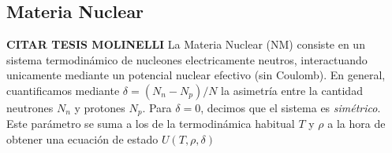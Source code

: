 \subsection{Materia Nuclear}{\label{sec:intro_NM}}

\textbf{CITAR TESIS MOLINELLI}
La Materia Nuclear (NM) consiste en un sistema termodinámico de nucleones electricamente neutros, interactuando unicamente mediante un potencial nuclear efectivo (sin Coulomb).
En general, cuantificamos mediante $\delta=(N_n - N_p)/N$ la asimetría entre la cantidad neutrones $N_n$ y protones $N_p$.
Para $\delta=0$, decimos que el sistema es \textit{simétrico}.
Este parámetro se suma a los de la termodinámica habitual $T$ y $\rho$ a la hora de obtener una ecuación de estado $U(T,\rho, \delta)$
